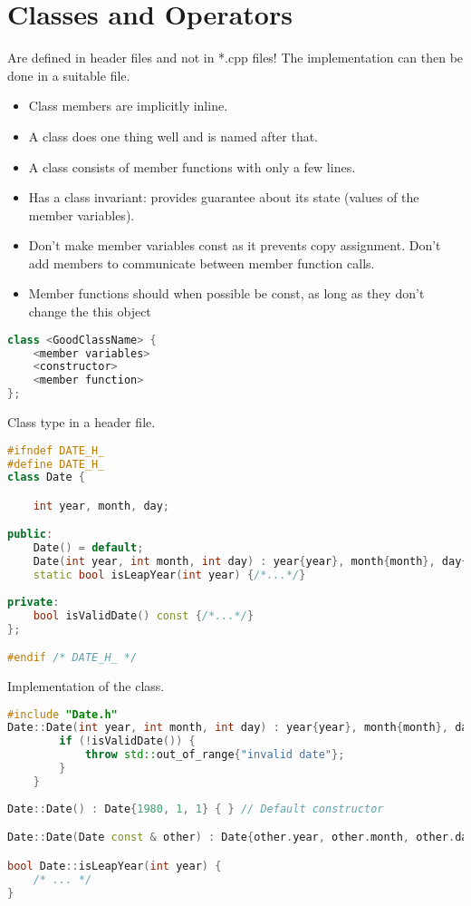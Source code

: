 
\section{Classes and Operators}
Are defined in header files and not in *.cpp files! The implementation can then be done in a suitable file.
\begin{itemize}
  \itemsep -0.5em 
  \item Class members are implicitly inline.
  \item A class does one thing well and is named after that.
  \item A class consists of member functions with only a few lines.
  \item Has a class invariant: provides guarantee about its state (values of the member variables).
  \item Don't make member variables const as it prevents copy assignment. Don't add members to communicate between member function calls.
  \item Member functions should when possible be const, as long as they don't change the this object
\end{itemize}

\begin{lstlisting}[language=C++]
class <GoodClassName> {
	<member variables>
	<constructor>
	<member function>
};
\end{lstlisting}

Class type in a header file.
\begin{lstlisting}[language=C++]
#ifndef DATE_H_
#define DATE_H_
class Date {

	int year, month, day;

public:
	Date() = default;
	Date(int year, int month, int day) : year{year}, month{month}, day{day} {/*...*/}
	static bool isLeapYear(int year) {/*...*/}
	
private:
	bool isValidDate() const {/*...*/} 
};

#endif /* DATE_H_ */
\end{lstlisting}

Implementation of the class. 
\begin{lstlisting}[language=C++]
#include "Date.h"
Date::Date(int year, int month, int day) : year{year}, month{month}, day{day} {
		if (!isValidDate()) {
			throw std::out_of_range{"invalid date"}; 
		}
	}
	
Date::Date() : Date{1980, 1, 1} { } // Default constructor

Date::Date(Date const & other) : Date{other.year, other.month, other.day} { } // copy constructor

bool Date::isLeapYear(int year) {
	/* ... */
}
\end{lstlisting}

